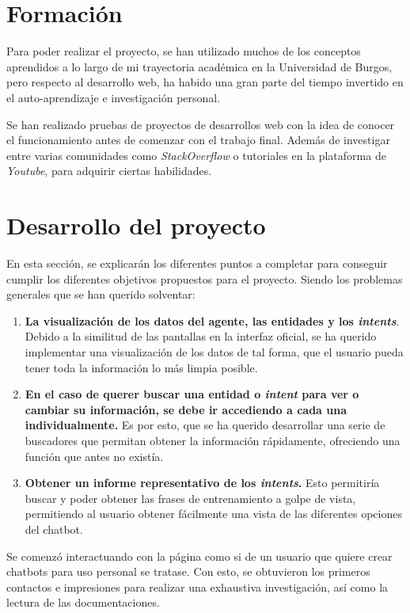 \section{Formación}
Para poder realizar el proyecto, se han utilizado muchos de los conceptos aprendidos a lo largo de mi trayectoria académica en la Universidad de Burgos, pero respecto al desarrollo web, ha habido una gran parte del tiempo invertido en el auto-aprendizaje e investigación personal.

Se han realizado pruebas de proyectos de desarrollos web con la idea de conocer el funcionamiento antes de comenzar con el trabajo final. Además de investigar entre varias comunidades como \textit{StackOverflow} o tutoriales en la plataforma de \textit{Youtube}, para adquirir ciertas habilidades.


\section{Desarrollo del proyecto}
En esta sección, se explicarán los diferentes puntos a completar para conseguir cumplir los diferentes objetivos propuestos para el proyecto. Siendo los problemas generales que se han querido solventar:

\begin{enumerate}
    \item \textbf{La visualización de los datos del agente, las entidades y los \textit{intents}}. Debido a la similitud de las pantallas en la interfaz oficial, se ha querido implementar una visualización de los datos de tal forma, que el usuario pueda tener toda la información lo más limpia posible.
    \item \textbf{En el caso de querer buscar una entidad o \textit{intent} para ver o cambiar su información, se debe ir accediendo a cada una individualmente.} Es por esto, que se ha querido desarrollar una serie de buscadores que permitan obtener la información rápidamente, ofreciendo una función que antes no existía.
    \item \textbf{Obtener un informe representativo de los \textit{intents}.} Esto permitiría buscar y poder obtener las frases de entrenamiento a golpe de vista, permitiendo al usuario obtener fácilmente una vista de las diferentes opciones del chatbot.
\end{enumerate}

Se comenzó interactuando con la página como si de un usuario que quiere crear chatbots para uso personal se tratase. Con esto, se obtuvieron los primeros contactos e impresiones para realizar una exhaustiva investigación, así como la lectura de las documentaciones.

